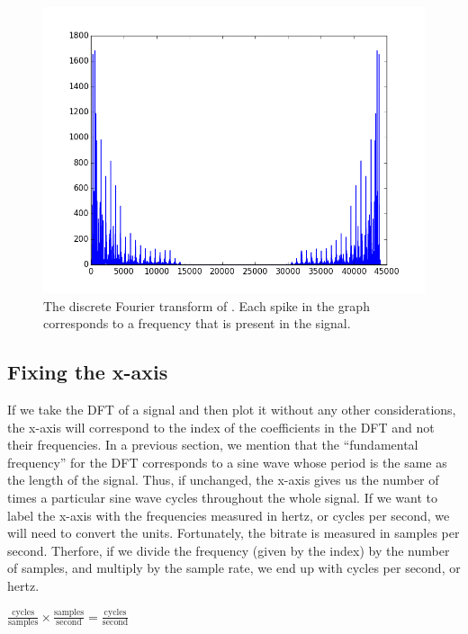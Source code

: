 \begin{center}
\begin{figure}
\includegraphics[scale=0.7]{tada_dft}
\caption{The discrete Fourier transform of .  Each spike in the graph corresponds to a frequency that is present in the signal.}
\label{fig:dft_tada}
\end{figure}
\end{center} 

\subsection*{Fixing the x-axis}

If we take the DFT of a signal and then plot it without any other considerations, the x-axis will correspond to the index of the coefficients in the DFT and not their frequencies.
In a previous section, we mention that the ``fundamental frequency'' for the DFT corresponds to a sine wave whose period is the same as the length of the signal.
Thus, if unchanged, the x-axis gives us the number of times a particular sine wave cycles throughout the whole signal.
If we want to label the x-axis with the frequencies measured in hertz, or cycles per second, we will need to convert the units.
Fortunately, the bitrate is measured in samples per second.
Therfore, if we divide the frequency (given by the index) by the number of samples, and multiply by the sample rate, we end up with cycles per second, or hertz.

\begin{center}
    $\frac{\mbox{cycles}}{\mbox{samples}} \times \frac{\mbox{samples}}{\mbox{second}} = \frac{\mbox{cycles}}{\mbox{second}}$
\end{center}

